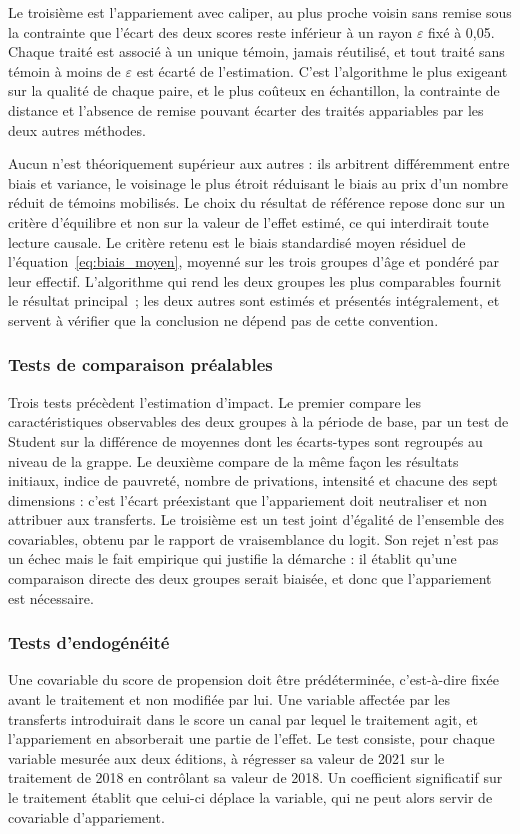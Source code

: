 Le troisième est l'appariement avec caliper, au plus proche voisin sans
remise sous la contrainte que l'écart des deux scores reste inférieur à un
rayon $\varepsilon$ fixé à 0,05. Chaque traité est associé à un unique témoin,
jamais réutilisé, et tout traité sans témoin à moins de $\varepsilon$ est
écarté de l'estimation. C'est l'algorithme le plus exigeant sur la qualité
de chaque paire, et le plus coûteux en échantillon, la contrainte de
distance et l'absence de remise pouvant écarter des traités appariables
par les deux autres méthodes.

Aucun n'est théoriquement supérieur aux autres :
ils arbitrent différemment entre biais et variance, le voisinage le plus étroit
réduisant le biais au prix d'un nombre réduit de témoins mobilisés. Le choix du
résultat de référence repose donc sur un critère d'équilibre et non sur la
valeur de l'effet estimé, ce qui interdirait toute lecture causale. Le critère
retenu est le biais standardisé moyen résiduel de
l'équation~\eqref{eq:biais_moyen}, moyenné sur les trois groupes d'âge et
pondéré par leur effectif. L'algorithme qui rend les deux groupes les plus
comparables fournit le résultat principal~; les deux autres sont estimés et
présentés intégralement, et servent à vérifier que la conclusion ne dépend
pas de cette convention.

\subsubsection{Tests de comparaison préalables}
Trois tests précèdent l'estimation d'impact. Le premier compare les
caractéristiques observables des deux groupes à la période de base, par un test
de Student sur la différence de moyennes dont les écarts-types sont
regroupés au niveau de la grappe. Le deuxième compare de la même façon les
résultats initiaux, indice de pauvreté, nombre de privations, intensité et
chacune des sept dimensions : c'est l'écart préexistant que l'appariement
doit neutraliser et non attribuer aux transferts. Le troisième est
un test joint d'égalité de l'ensemble des covariables, obtenu par le rapport de
vraisemblance du logit. Son rejet n'est pas un échec mais le fait empirique qui
justifie la démarche : il établit qu'une comparaison directe des deux groupes
serait biaisée, et donc que l'appariement est nécessaire.

\subsubsection{Tests d'endogénéité}
Une covariable du score de propension doit être prédéterminée, c'est-à-dire
fixée avant le traitement et non modifiée par lui. Une variable affectée par
les transferts introduirait dans le score un canal par lequel le traitement
agit, et l'appariement en absorberait une partie de l'effet. Le test consiste,
pour chaque variable mesurée aux deux éditions, à régresser sa valeur de 2021 sur
le traitement de 2018 en contrôlant sa valeur de 2018. Un coefficient
significatif sur le traitement établit que celui-ci déplace la variable, qui ne
peut alors servir de covariable d'appariement.

